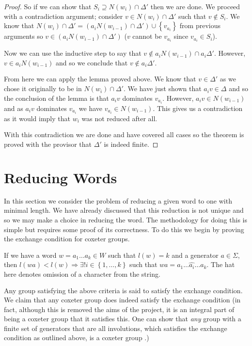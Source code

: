 \documentclass[a4paper,12pt]{article}
\begin{document}
\begin{proof}
	So if we can show that $S_i \supseteq N(w_i) \cap \Delta'$ then we are done. We proceed with a contradiction argument; consider $v \in N(w_i) \cap \Delta'$ such that $v \notin S_i$. We know that $N(w_i) \cap \Delta' = (a_iN(w_{i-1}) \cap \Delta') \cup \left\{v_{a_i}\right\}$ from previous arguments so $v \in (a_iN(w_{i-1}) \cap \Delta')$ ($v$ cannot be $v_{a_i}$ since $v_{a_i} \in S_i$). 
	
	Now we can use the inductive step to say that $v \notin a_iN(w_{i-1}) \cap a_i\Delta'$. However, $v \in a_iN(w_{i-1})$ and so we conclude that $v \notin a_i\Delta'$. 
	
	From here we can apply the lemma proved above. We know that $v \in \Delta'$ as we chose it originally to be in $N(w_i) \cap \Delta'$. We have just shown that $a_iv \in \Delta$ and so the conclusion of the lemma is that $a_iv$ dominates $v_{a_i}$. However, $a_iv \in N(w_{i-1})$ and as $a_iv$ dominates $v_{a_i}$ we have $v_{a_i} \in N(w_{i-1})$. This gives us a contradiction as it would imply that $w_i$ was not reduced after all.
	
	With this contradiction we are done and have covered all cases so the theorem is proved with the provisor that $\Delta'$ is indeed finite.
\end{proof}

\section{Reducing Words}

In this section we consider the problem of reducing a given word to one with minimal length. We have already discussed that this reduction is not unique and so we may make a choice in reducing the word. The methodology for doing this is simple but requires some proof of its correctness. To do this we begin by proving the exchange condition for coxeter groups.

\begin{definition}
	\label{exchange_condition}
	If we have a word $w = a_1 \ldots a_k \in W$ such that $l(w) = k$ and a generator $a \in \Sigma$, then $l(wa) < l(w) \Rightarrow \exists! i \in \left\{1, \ldots, k\right\}$ such that $wa = a_1 \ldots \hat{a_i} \ldots a_k$. The hat here denotes omission of a character from the string.
\end{definition}

Any group satisfying the above criteria is said to satisfy the exchange condition. We claim that any coxeter group does indeed satisfy the exchange condition (in fact, although this is removed the aims of the project, it is an integral part of being a coxeter group that it satisfies this. One can show that \textit{any} group with a finite set of generators that are all involutions, which satisfies the exchange condition as outlined above, is a coxeter group \cite{bourbaki46}.)
\end{document}
